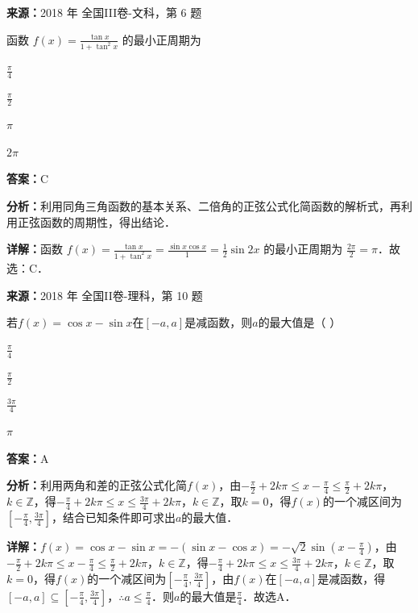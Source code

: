 \begin{question}[points=5]
\textbf{来源：}2018 年 全国III卷-文科，第 6 题\par
函数 $f(x) = \frac{\tan x}{1+\tan^2 x}$ 的最小正周期为
\begin{choices}
  \item $\frac{\pi}{4}$
  \item $\frac{\pi}{2}$
  \item $\pi$
  \item $2\pi$
\end{choices}
\begin{solution}
\textbf{答案：}C

\textbf{分析：}利用同角三角函数的基本关系、二倍角的正弦公式化简函数的解析式，再利用正弦函数的周期性，得出结论．

\textbf{详解：}函数 $f(x) = \frac{\tan x}{1+\tan^2 x} = \frac{\sin x \cos x}{1} = \frac{1}{2}\sin 2x$ 的最小正周期为 $\frac{2\pi}{2} = \pi$．故选：C．
\end{solution}
\end{question}

\begin{question}[points=5]
\textbf{来源：}2018 年 全国II卷-理科，第 10 题\par
若$f(x)=\cos x-\sin x$在$[-a,a]$是减函数，则$a$的最大值是（                                                 ）
\begin{choices}
  \item $\frac{\pi}{4}$
  \item $\frac{\pi}{2}$
  \item $\frac{3\pi}{4}$
  \item $\pi$
\end{choices}
\begin{solution}
\textbf{答案：}A

\textbf{分析：}利用两角和差的正弦公式化简$f(x)$，由$-\frac{\pi}{2}+2k\pi\le x-\frac{\pi}{4}\le \frac{\pi}{2}+2k\pi$，$k\in\mathbb{Z}$，得$-\frac{\pi}{4}+2k\pi\le x\le \frac{3\pi}{4}+2k\pi$，$k\in\mathbb{Z}$，取$k=0$，得$f(x)$的一个减区间为$[-\frac{\pi}{4},\frac{3\pi}{4}]$，结合已知条件即可求出$a$的最大值．

\textbf{详解：}$f(x)=\cos x-\sin x=-(\sin x-\cos x)=-\sqrt{2}\sin(x-\frac{\pi}{4})$，由$-\frac{\pi}{2}+2k\pi\le x-\frac{\pi}{4}\le \frac{\pi}{2}+2k\pi$，$k\in\mathbb{Z}$，得$-\frac{\pi}{4}+2k\pi\le x\le \frac{3\pi}{4}+2k\pi$，$k\in\mathbb{Z}$，取$k=0$，得$f(x)$的一个减区间为$[-\frac{\pi}{4},\frac{3\pi}{4}]$，由$f(x)$在$[-a,a]$是减函数，得$[-a,a]\subseteq[-\frac{\pi}{4},\frac{3\pi}{4}]$，$\therefore a\le\frac{\pi}{4}$．则$a$的最大值是$\frac{\pi}{4}$．故选A．
\end{solution}
\end{question}

